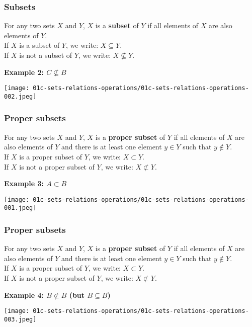 \documentclass[fleqn,10pt,serif,xcolor=svgnames,xcolor=table,aspectratio=169]{beamer}
\begin{document}
\begin{frame}
  \frametitle{Subsets}

  For any two sets $X$ and $Y$, $X$ is a \textbf{subset} of $Y$ if all elements of $X$ are also elements of $Y$. \\
  If $X$ is a subset of $Y$, we write: $X \subseteq Y$.\\
  If $X$ is not a subset of $Y$, we write: $X \not \subseteq Y$.

  \bigskip

  \hfill \textbf{Example 2: $C \not \subseteq B$}

  \hfill \texttt{[image: 01c-sets-relations-operations/01c-sets-relations-operations-002.jpeg]}

\end{frame}

\begin{frame}
  \frametitle{Proper subsets}

  For any two sets $X$ and $Y$, $X$ is a \textbf{proper subset} of $Y$ if all elements of $X$ are also elements of $Y$ and there is at least one element $y \in Y$ such that $y \not \in Y$.\\
  If $X$ is a proper subset of $Y$, we write: $X \subset Y$.\\
  If $X$ is not a proper subset of $Y$, we write: $X \not \subset Y$.

\pause

  \bigskip

  \hfill \textbf{Example 3: $A \subset B$}

  \hfill \texttt{[image: 01c-sets-relations-operations/01c-sets-relations-operations-001.jpeg]}

\end{frame}

\begin{frame}
  \frametitle{Proper subsets}

  For any two sets $X$ and $Y$, $X$ is a \textbf{proper subset} of $Y$ if all elements of $X$ are also elements of $Y$ and there is at least one element $y \in Y$ such that $y \not \in Y$.\\
  If $X$ is a proper subset of $Y$, we write: $X \subset Y$.\\
  If $X$ is not a proper subset of $Y$, we write: $X \not \subset Y$.

\pause

  \bigskip

  \hfill \textbf{Example 4: $B \not \subset B$ (but $B \subseteq B$)}

  \hfill \texttt{[image: 01c-sets-relations-operations/01c-sets-relations-operations-003.jpeg]}

\end{frame}
\end{document}
